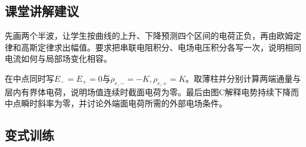 \documentclass[UTF8,fontset=fandol,a4paper,11pt]{ctexart}
\begin{document}


\subsection*{课堂讲解建议}

先画两个半波，让学生按曲线的上升、下降预测四个区间的电荷正负，再由欧姆定律和高斯定律求出幅值。要求把串联电阻积分、电场电压积分各写一次，说明相同电流如何与局部场变化相容。

在中点同时写$E_-=E_+=0$与$\rho_{e,-}=-K,\rho_{e,+}=K$。取薄柱并分别计算两端通量与层内有界体电荷，说明场值连续时截面电荷为零。最后由图C解释电势持续下降而中点瞬时斜率为零，并讨论外端面电荷所需的外部电场条件。



\subsection*{变式训练}
\end{document}
